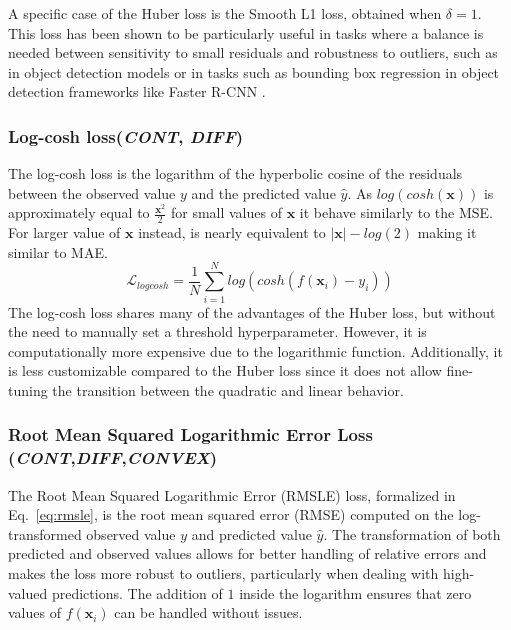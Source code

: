 \documentclass[sn-mathphys-num]{sn-jnl}%
\newcommand \cont{\textit{CONT}}
\newcommand \diff{\textit{DIFF}}
\newcommand \conv{\textit{CONVEX}}
\renewcommand\vec{\mathbf}
\begin{document}
    A specific case of the Huber loss is the Smooth L1 loss, obtained when \(\delta = 1\). This loss has been shown to be particularly useful in tasks where a balance is needed between sensitivity to small residuals and robustness to outliers, such as in object detection models \cite{girshick2015fast} or in tasks such as bounding box regression in object detection frameworks like Faster R-CNN \cite{ren2015faster}.
    
    \subsubsection{Log-cosh loss(\cont, \diff)}\label{subsubsec-regression_log-cosh}
    The log-cosh loss is the logarithm of the hyperbolic cosine of the residuals between the observed value $y$ and the predicted value $\hat{y}$. 
    As $log \left ( cosh \left ( \vec{x} \right ) \right )$ is approximately equal to $\frac{\vec{x}^{2}}{2}$ for small values of $\vec{x}$ it behave similarly to the MSE. For larger value of $\vec{x}$ instead, is nearly equivalent to $\left | \vec{x} \right | -  log \left ( 2 \right ) $ making it similar to MAE.
    \begin{equation}
        \mathcal{L}_{logcosh} = \frac{1}{N} \sum_{i=1}^{N} log \left ( cosh \left ( f(\vec{x}_i) - y_i \right ) \right )
    \end{equation}
    The log-cosh loss shares many of the advantages of the Huber loss, but without the need to manually set a threshold hyperparameter. However, it is computationally more expensive due to the logarithmic function. Additionally, it is less customizable compared to the Huber loss since it does not allow fine-tuning the transition between the quadratic and linear behavior.

    
    \subsubsection{Root Mean Squared Logarithmic Error Loss (\cont,\diff,\conv)}\label{subsubsec-regression_RMSLE}
The Root Mean Squared Logarithmic Error (RMSLE) loss, formalized in Eq.~\ref{eq:rmsle}, is the root mean squared error (RMSE) computed on the log-transformed observed value $y$ and predicted value $\hat{y}$. The transformation of both predicted and observed values allows for better handling of relative errors and makes the loss more robust to outliers, particularly when dealing with high-valued predictions. The addition of $1$ inside the logarithm ensures that zero values of $f(\vec{x}_i)$ can be handled without issues.
\end{document}
